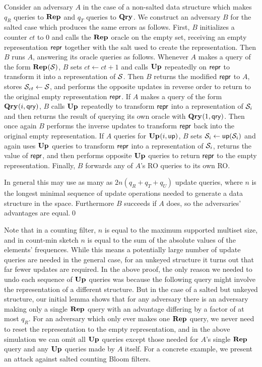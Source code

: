 Consider an adversary $A$ in the case of a non-salted data structure which makes $q_R$ queries to $\mathbf{Rep}\hspace{0.5pt}$ and $q_T$ queries to $\mathbf{Qry}\hspace{0.5pt}$. We construct an adversary $B$ for the salted case which produces the same errors as follows. First, $B$ initializes a counter $ct$ to 0 and calls the $\mathbf{Rep}\hspace{0.5pt}$ oracle on the empty set, receiving an empty representation $\mathsf{repr}$ together with the salt used to create the representation. Then $B$ runs $A$, answering its oracle queries as follows. Whenever $A$ makes a query of the form $\mathbf{Rep}\hspace{0.5pt}(\mathcal{S})$, $B$ sets $ct \gets ct + 1$ and calls $\mathbf{Up}\hspace{0.5pt}$ repeatedly on $\mathsf{repr}$ to transform it into a representation of $\mathcal{S}$. Then $B$ returns the modified $\mathsf{repr}$ to $A$, stores $\mathcal{S}_{ct} \gets \mathcal{S}$, and performs the opposite updates in reverse order to return to the original empty representation $\mathsf{repr}$. If $A$ makes a query of the form $\mathbf{Qry}\hspace{0.5pt}(i,\mathsf{qry})$, $B$ calls $\mathbf{Up}\hspace{0.5pt}$ repeatedly to transform $\mathsf{repr}$ into a representation of $\mathcal{S}_i$ and then returns the result of querying its own oracle with $\mathbf{Qry}\hspace{0.5pt}(1, \mathsf{qry})$. Then once again $B$ performs the inverse updates to transform $\mathsf{repr}$ back into the original empty representation. If $A$ queries for $\mathbf{Up}\hspace{0.5pt}(i, \mathsf{up})$, $B$ sets $\mathcal{S}_i \gets \mathsf{up}(\mathcal{S}_i)$ and again uses $\mathbf{Up}\hspace{0.5pt}$ queries to transform $\mathsf{repr}$ into a representation of $\mathcal{S}_i$, returns the value of $\mathsf{repr}$, and then performs opposite $\mathbf{Up}\hspace{0.5pt}$ queries to return $\mathsf{repr}$ to the empty representation. Finally, $B$ forwards any of $A$'s RO queries to its own RO.

In general this may use as many as $2n(q_R+q_T+q_U)$ update queries, where $n$ is the longest minimal sequence of update operations needed to generate a data structure in the space. Furthermore $B$ succeeds if $A$ does, so the adversaries' advantages are equal.\hfill\qed

Note that in a counting filter, $n$ is equal to the maximum supported multiset size, and in count-min sketch $n$ is equal to the sum of the absolute values of the elements' frequences. While this means a potentially large number of update queries are needed in the general case, for an unkeyed structure it turns out that far fewer updates are required. In the above proof, the only reason we needed to undo each sequence of $\mathbf{Up}\hspace{0.5pt}$ queries was because the following query might involve the representation of a different structure. But in the case of a salted but unkeyed structure, our initial lemma shows that for any adversary there is an adversary making only a single $\mathbf{Rep}\hspace{0.5pt}$ query with an advantage differing by a factor of at most $q_R$. For an adversary which only ever makes one $\mathbf{Rep}\hspace{0.5pt}$ query, we never need to reset the representation to the empty representation, and in the above simulation we can omit all $\mathbf{Up}\hspace{0.5pt}$ queries except those needed for $A$'s single $\mathbf{Rep}\hspace{0.5pt}$ query and any $\mathbf{Up}\hspace{0.5pt}$ queries made by $A$ itself. For a concrete example, we present an attack against salted counting Bloom filters.

